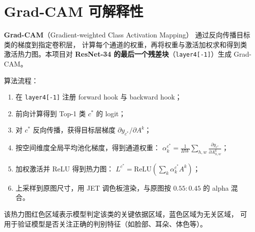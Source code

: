 \documentclass[12pt, a4paper, openany]{ctexbook}
\begin{document}
\section{Grad-CAM 可解释性}

\textbf{Grad-CAM}（Gradient-weighted Class Activation Mapping）
\cite{selvaraju2017gradcam} 通过反向传播目标类的梯度到指定卷积层，
计算每个通道的权重，再将权重与激活加权求和得到类激活热力图。本项目对
\textbf{ResNet-34 的最后一个残差块}（\texttt{layer4[-1]}）生成 Grad-CAM。

算法流程：

\begin{enumerate}[leftmargin=*]
  \item 在 \texttt{layer4[-1]} 注册 forward hook 与 backward hook；
  \item 前向计算得到 Top-1 类 $c^*$ 的 logit；
  \item 对 $c^*$ 反向传播，获得目标层梯度 $\partial y_{c^*} / \partial A^k$；
  \item 按空间维度全局平均池化梯度，得到通道权重：
        $\alpha_k^{c^*} = \frac{1}{HW}\sum_{h,w} \frac{\partial y_{c^*}}{\partial A_{h,w}^k}$；
  \item 加权激活并 ReLU 得到热力图：
        $L^{c^*} = \text{ReLU}\left(\sum_k \alpha_k^{c^*} A^k\right)$；
  \item 上采样到原图尺寸，用 JET 调色板渲染，与原图按 $0.55:0.45$ 的 alpha 混合。
\end{enumerate}

该热力图红色区域表示模型判定该类的关键依据区域，蓝色区域为无关区域，
可用于验证模型是否关注正确的判别特征（如脸部、耳朵、体色等）。
\end{document}
